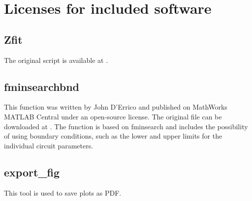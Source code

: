 \documentclass[10pt,b5paper,oneside]{book}
\begin{document}
\newpage
\chapter{Licenses for included software}

\section{Zfit}

The original script is available at \cite{Dellis2010}.


\section{fminsearchbnd}

This function was written by John D'Errico and published on MathWorks MATLAB Central under an open-source license. The original file can be downloaded at \cite{DErrico2012}. The function is based on fminsearch and includes the possibility of using boundary conditions, such as the lower and upper limits for the individual circuit parameters.


\section{export\_fig}

This tool is used to save plots as PDF.







\end{document}
